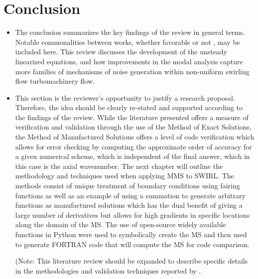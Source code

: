 \section{Conclusion}
\begin{itemize}
    \item The conclusion summarizes 
        the key findings of the review in general terms. Notable commonalities between works, whether favorable or not
        , may be included here.
        \subitem This review discusses the development of the unsteady linearized equations, 
        and how improvements in the modal analysis capture more families of mechanisms of noise generation within non-uniform 
        swirling flow turbomachinery flow. 
    \item This section is the reviewer’s opportunity to justify a research 
        proposal. Therefore, the idea should be clearly re-stated and supported 
        according to the findings of the review.
        \subitem While the literature presented offers a measure of verification 
        and validation through the use of the Method of Exact Solutions, the Method 
        of Manufactured Solutions offers a level of code verification which allows
        for error checking by computing the approximate order of accuracy for 
        a given numerical scheme, which is independent of the final answer, which
        in this case is the axial wavenumber. The next chapter will outline the methodology
        and techniques used when applying MMS to SWIRL. The methods consist
        of unique treatment of boundary conditions using fairing functions as
        well as an example of using a summation to generate arbitrary functions 
        as manufactured solutions which has the dual benefit of giving a large
        number of derivatives but allows for high gradients in specific locations
        along the domain of the MS. The use of open-source widely available functions
        in Python were used to symbolically create the MS and then 
        used to generate FORTRAN code that will compute the MS for code comparison. 
        
        
        
        \subitem (Note: This literature review should be expanded to describe 
        specific details in the methodologies and validation techniques reported 
        by \cite{kousen1995eigenmode,kousen1996pressure,Golubev1997,Golubev1998}. 
\end{itemize}

